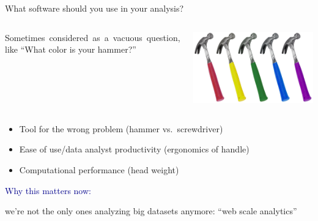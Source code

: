 \documentclass[aspectratio=169]{beamer}
\begin{document}
\begin{frame}{What software should you use in your analysis?}
\large
\vspace{0.75 cm}
\begin{columns}
\mbox{Sometimes considered as a vacuous question,\hspace{-1 cm}} \\ like ``What color is your hammer?''

\vspace{0.75 cm}
\includegraphics[width=\linewidth]{hammer.jpg}
\end{columns}

\vspace{0.75 cm}

\large
\vspace{0.1 cm}
\begin{itemize}\setlength{\itemsep}{0.2 cm}
\item<4-> Tool for the wrong problem \hfill (hammer vs.\ screwdriver)
\item<5-> Ease of use/data analyst productivity \hfill (ergonomics of handle)
\item<6-> Computational performance \hfill (head weight)
\end{itemize}
\end{frame}

\begin{frame}{}
\vspace{1 cm}
\begin{center}
\huge \textcolor{darkblue}{Why this matters now:}

\vspace{0.5 cm}
\large we're not the only ones analyzing big datasets anymore: ``web scale analytics''
\end{center}
\end{frame}
\end{document}
